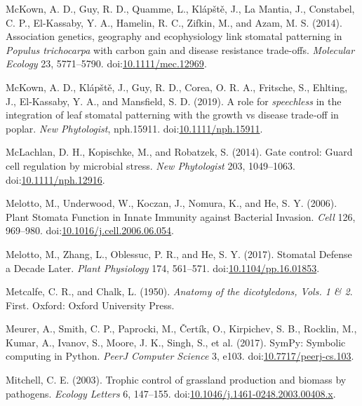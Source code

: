 \documentclass[utf8]{frontiersSCNS}
\begin{document}
\leavevmode\hypertarget{ref-mckown_association_2014}{}%
McKown, A. D., Guy, R. D., Quamme, L., Klápště, J., La Mantia, J.,
Constabel, C. P., El-Kassaby, Y. A., Hamelin, R. C., Zifkin, M., and
Azam, M. S. (2014). Association genetics, geography and ecophysiology
link stomatal patterning in \emph{Populus trichocarpa} with carbon gain
and disease resistance trade-offs. \emph{Molecular Ecology} 23,
5771--5790.
doi:\href{https://doi.org/10.1111/mec.12969}{10.1111/mec.12969}.

\leavevmode\hypertarget{ref-mckown_role_2019}{}%
McKown, A. D., Klápště, J., Guy, R. D., Corea, O. R. A., Fritsche, S.,
Ehlting, J., El‐Kassaby, Y. A., and Mansfield, S. D. (2019). A role for
\emph{speechless} in the integration of leaf stomatal patterning with
the growth vs disease trade‐off in poplar. \emph{New Phytologist},
nph.15911.
doi:\href{https://doi.org/10.1111/nph.15911}{10.1111/nph.15911}.

\leavevmode\hypertarget{ref-mclachlan_gate_2014}{}%
McLachlan, D. H., Kopischke, M., and Robatzek, S. (2014). Gate control:
Guard cell regulation by microbial stress. \emph{New Phytologist} 203,
1049--1063.
doi:\href{https://doi.org/10.1111/nph.12916}{10.1111/nph.12916}.

\leavevmode\hypertarget{ref-melotto_plant_2006}{}%
Melotto, M., Underwood, W., Koczan, J., Nomura, K., and He, S. Y.
(2006). Plant Stomata Function in Innate Immunity against Bacterial
Invasion. \emph{Cell} 126, 969--980.
doi:\href{https://doi.org/10.1016/j.cell.2006.06.054}{10.1016/j.cell.2006.06.054}.

\leavevmode\hypertarget{ref-melotto_stomatal_2017}{}%
Melotto, M., Zhang, L., Oblessuc, P. R., and He, S. Y. (2017). Stomatal
Defense a Decade Later. \emph{Plant Physiology} 174, 561--571.
doi:\href{https://doi.org/10.1104/pp.16.01853}{10.1104/pp.16.01853}.

\leavevmode\hypertarget{ref-metcalfe_anatomy_1950}{}%
Metcalfe, C. R., and Chalk, L. (1950). \emph{Anatomy of the
dicotyledons, Vols. 1 \& 2}. First. Oxford: Oxford University Press.

\leavevmode\hypertarget{ref-meurer_sympy:_2017}{}%
Meurer, A., Smith, C. P., Paprocki, M., Čertík, O., Kirpichev, S. B.,
Rocklin, M., Kumar, A., Ivanov, S., Moore, J. K., Singh, S., et al.
(2017). SymPy: Symbolic computing in Python. \emph{PeerJ Computer
Science} 3, e103.
doi:\href{https://doi.org/10.7717/peerj-cs.103}{10.7717/peerj-cs.103}.

\leavevmode\hypertarget{ref-mitchell_trophic_2003}{}%
Mitchell, C. E. (2003). Trophic control of grassland production and
biomass by pathogens. \emph{Ecology Letters} 6, 147--155.
doi:\href{https://doi.org/10.1046/j.1461-0248.2003.00408.x}{10.1046/j.1461-0248.2003.00408.x}.
\end{document}
